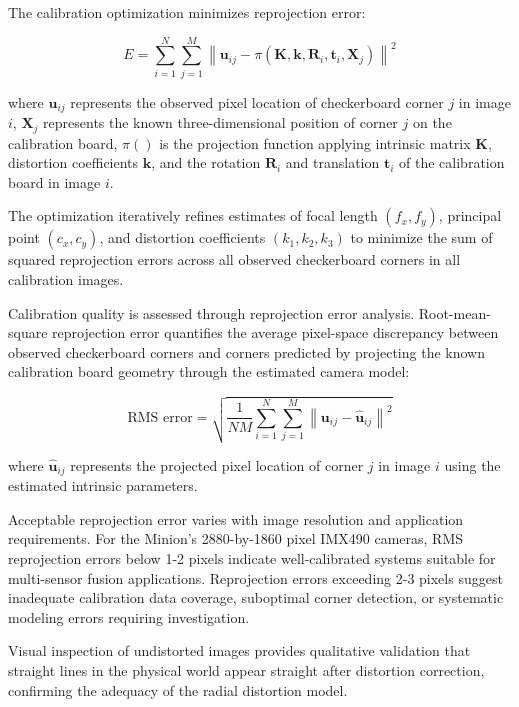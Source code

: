 The calibration optimization minimizes reprojection error:

\begin{equation}
    E = \sum_{i=1}^{N} \sum_{j=1}^{M} \left\| \mathbf{u}_{ij} - \pi(\mathbf{K}, \mathbf{k}, \mathbf{R}_i, \mathbf{t}_i, \mathbf{X}_j) \right\|^2
\end{equation}


where $\mathbf{u}_{ij}$ represents the observed pixel location of checkerboard corner $j$ in image $i$, $\mathbf{X}_j$ represents the known three-dimensional position of corner $j$ on the calibration board, $\pi()$ is the projection function applying intrinsic matrix $\mathbf{K}$, distortion coefficients $\mathbf{k}$, and the rotation $\mathbf{R}_i$ and translation $\mathbf{t}_i$ of the calibration board in image $i$.

The optimization iteratively refines estimates of focal length $(f_x, f_y)$, principal point $(c_x, c_y)$, and distortion coefficients $(k_1, k_2, k_3)$ to minimize the sum of squared reprojection errors across all observed checkerboard corners in all calibration images.


Calibration quality is assessed through reprojection error analysis.
Root-mean-square reprojection error quantifies the average pixel-space discrepancy between observed checkerboard corners and corners predicted by projecting the known calibration board geometry through the estimated camera model:

$$\text{RMS error} = \sqrt{\frac{1}{NM}\sum_{i=1}^{N} \sum_{j=1}^{M} \left\| \mathbf{u}_{ij} - \hat{\mathbf{u}}_{ij} \right\|^2}$$

where $\hat{\mathbf{u}}_{ij}$ represents the projected pixel location of corner $j$ in image $i$ using the estimated intrinsic parameters.

Acceptable reprojection error varies with image resolution and application requirements.
For the Minion's 2880-by-1860 pixel IMX490 cameras, RMS reprojection errors below 1-2 pixels indicate well-calibrated systems suitable for multi-sensor fusion applications.
Reprojection errors exceeding 2-3 pixels suggest inadequate calibration data coverage, suboptimal corner detection, or systematic modeling errors requiring investigation.

Visual inspection of undistorted images provides qualitative validation that straight lines in the physical world appear straight after distortion correction, confirming the adequacy of the radial distortion model.



